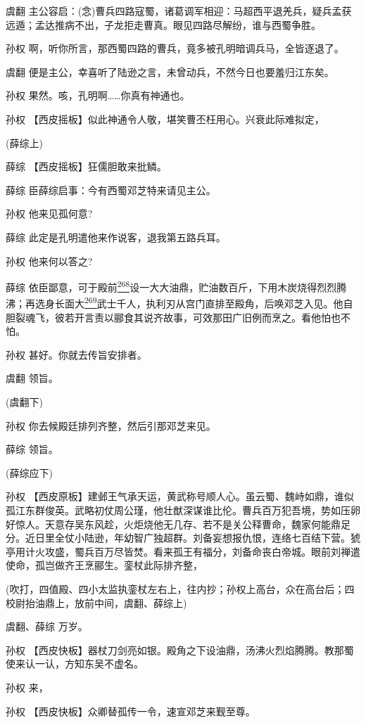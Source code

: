 虞翻
主公容启：(念)曹兵四路寇蜀，诸葛调军相迎：马超西平退羌兵，疑兵孟获远遁；孟达推病不出，子龙拒走曹真。眼见四路尽解纷，谁与西蜀争胜。

孙权 啊，听你所言，那西蜀四路的曹兵，竟多被孔明暗调兵马，全皆逐退了。

虞翻 便是主公，幸喜听了陆逊之言，未曾动兵，不然今日也要羞归江东矣。

孙权 果然。咳，孔明啊\ldots{}\ldots{}你真有神通也。

孙权 【西皮摇板】似此神通令人敬，堪笑曹丕枉用心。兴衰此际难拟定，

(薛综上)

薛综 【西皮摇板】狂儒胆敢来批鳞。

薛综 臣薛综启事：今有西蜀邓芝特来请见主公。

孙权 他来见孤何意?

薛综 此定是孔明遣他来作说客，退我第五路兵耳。

孙权 他来何以答之?

薛综
依臣鄙意，可于殿前\protect\hyperlink{fn268}{\textsuperscript{268}}设一大大油鼎，贮油数百斤，下用木炭烧得烈烈腾沸；再选身长面大\protect\hyperlink{fn269}{\textsuperscript{269}}武士千人，执利刃从宫门直排至殿角，后唤邓芝入见。他自胆裂魂飞，彼若开言责以郦食其说齐故事，可效那田广旧例而烹之。看他怕也不怕。

孙权 甚好。你就去传旨安排者。

虞翻 领旨。

(虞翻下)

孙权 你去候殿廷排列齐整，然后引那邓芝来见。

薛综 领旨。

(薛综应下)

孙权
【西皮原板】建邺王气承天运，黄武称号顺人心。虽云蜀、魏峙如鼎，谁似孤江东群俊英。武略初仗周公瑾，他壮猷深谋谁比伦。曹兵百万犯吾境，势如压卵好惊人。天意存吴东风趁，火炬烧他无几存、若不是关公释曹命，魏家何能鼎足分。近日里全仗小陆逊，年幼智广独超群。刘备妄想报仇恨，连络七百结下营。猇亭用计火攻盛，蜀兵百万尽皆焚。看来孤王有福分，刘备命丧白帝城。眼前刘禅遣使命，孤岂做齐王烹郦生。銮杖此际排齐整，

(吹打，四值殿、四小太监执銮杖左右上，往内抄；孙权上高台，众在高台后；四校尉抬油鼎上，放前中间，虞翻、薛综上)

虞翻、薛综 万岁。

孙权
【西皮快板】器杖刀剑亮如银。殿角之下设油鼎，汤沸火烈焰腾腾。教那蜀使来认一认，方知东吴不虚名。

孙权 来，

孙权 【西皮快板】众卿替孤传一令，速宣邓芝来觐至尊。

